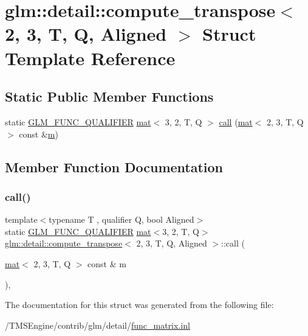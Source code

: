 \hypertarget{structglm_1_1detail_1_1compute__transpose_3_012_00_013_00_01_t_00_01_q_00_01_aligned_01_4}{}\section{glm\+:\+:detail\+:\+:compute\+\_\+transpose$<$ 2, 3, T, Q, Aligned $>$ Struct Template Reference}
\label{structglm_1_1detail_1_1compute__transpose_3_012_00_013_00_01_t_00_01_q_00_01_aligned_01_4}
\subsection*{Static Public Member Functions}
\begin{DoxyCompactItemize}
\item 
static \hyperlink{setup_8hpp_a33fdea6f91c5f834105f7415e2a64407}{G\+L\+M\+\_\+\+F\+U\+N\+C\+\_\+\+Q\+U\+A\+L\+I\+F\+I\+ER} \hyperlink{structglm_1_1mat}{mat}$<$ 3, 2, T, Q $>$ \hyperlink{structglm_1_1detail_1_1compute__transpose_3_012_00_013_00_01_t_00_01_q_00_01_aligned_01_4_a912a7588f6a6c2d499abd7df847096b6}{call} (\hyperlink{structglm_1_1mat}{mat}$<$ 2, 3, T, Q $>$ const \&\hyperlink{_s_d_l__opengl__glext_8h_af593500c283bf1a787a6f947f503a5c2}{m})
\end{DoxyCompactItemize}


\subsection{Member Function Documentation}
\mbox{\label{structglm_1_1detail_1_1compute__transpose_3_012_00_013_00_01_t_00_01_q_00_01_aligned_01_4_a912a7588f6a6c2d499abd7df847096b6}} 
\subsubsection{\texorpdfstring{call()}{call()}}
{\footnotesize\ttfamily template$<$typename T , qualifier Q, bool Aligned$>$ \\
static \hyperlink{setup_8hpp_a33fdea6f91c5f834105f7415e2a64407}{G\+L\+M\+\_\+\+F\+U\+N\+C\+\_\+\+Q\+U\+A\+L\+I\+F\+I\+ER} \hyperlink{structglm_1_1mat}{mat}$<$3, 2, T, Q$>$ \hyperlink{structglm_1_1detail_1_1compute__transpose}{glm\+::detail\+::compute\+\_\+transpose}$<$ 2, 3, T, Q, Aligned $>$\+::call (\begin{DoxyParamCaption}\item[{\hyperlink{structglm_1_1mat}{mat}$<$ 2, 3, T, Q $>$ const \&}]{m }\end{DoxyParamCaption})\hspace{0.3cm}{\ttfamily [inline]}, {\ttfamily [static]}}



The documentation for this struct was generated from the following file\+:\begin{DoxyCompactItemize}
\item 
/\+T\+M\+S\+Engine/contrib/glm/detail/\hyperlink{func__matrix_8inl}{func\+\_\+matrix.\+inl}\end{DoxyCompactItemize}
